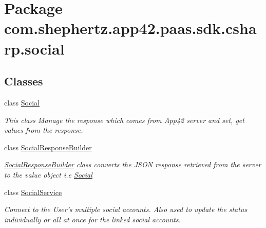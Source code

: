 \hypertarget{namespacecom_1_1shephertz_1_1app42_1_1paas_1_1sdk_1_1csharp_1_1social}{\section{Package com.\+shephertz.\+app42.\+paas.\+sdk.\+csharp.\+social}
\label{namespacecom_1_1shephertz_1_1app42_1_1paas_1_1sdk_1_1csharp_1_1social}
}
\subsection*{Classes}
\begin{DoxyCompactItemize}
\item 
class \hyperlink{classcom_1_1shephertz_1_1app42_1_1paas_1_1sdk_1_1csharp_1_1social_1_1_social}{Social}
\begin{DoxyCompactList}\small\item\em This class Manage the response which comes from App42 server and set, get values from the response. \end{DoxyCompactList}\item 
class \hyperlink{classcom_1_1shephertz_1_1app42_1_1paas_1_1sdk_1_1csharp_1_1social_1_1_social_response_builder}{Social\+Response\+Builder}
\begin{DoxyCompactList}\small\item\em \hyperlink{classcom_1_1shephertz_1_1app42_1_1paas_1_1sdk_1_1csharp_1_1social_1_1_social_response_builder}{Social\+Response\+Builder} class converts the J\+S\+O\+N response retrieved from the server to the value object i.\+e \hyperlink{classcom_1_1shephertz_1_1app42_1_1paas_1_1sdk_1_1csharp_1_1social_1_1_social}{Social} \end{DoxyCompactList}\item 
class \hyperlink{classcom_1_1shephertz_1_1app42_1_1paas_1_1sdk_1_1csharp_1_1social_1_1_social_service}{Social\+Service}
\begin{DoxyCompactList}\small\item\em Connect to the User's multiple social accounts. Also used to update the status individually or all at once for the linked social accounts. \end{DoxyCompactList}\end{DoxyCompactItemize}

